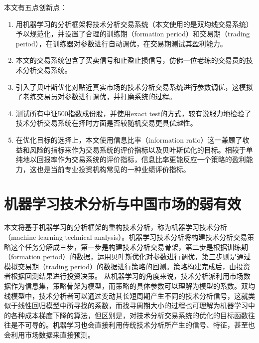 \documentclass[twoside,longtitle]{LZUthesis}
\begin{document}
本文有五点创新点：
\begin{enumerate}
    \item 用机器学习的分析框架将技术分析交易系统（本文使用的是双均线交易系统）予以规范化，并设置了合理的训练期（formation period）和交易期（trading period），在训练器对参数进行自动调优，在交易期测试其盈利能力。
    \item 本文的交易系统包含了买卖信号和止盈止损信号，仿佛一位老练的交易员的技术分析交易系统。
    \item 引入了贝叶斯优化对贴近真实市场的技术分析交易系统进行参数调优，这模拟了老练交易员对参数进行调优，并打磨系统的过程。
    \item 测试所有中证500指数成份股，并使用exact test的方式，较有说服力地检验了技术分析交易系统在择时方面是否较随机交易更具优越性。
    \item 在优化目标的选择上，本文使用信息比率（information ratio）这一兼顾了收益和风险的指标来作为交易系统的评价指标以及贝叶斯优化的目标。相较于单纯地以回报率作为交易系统的评价指标，信息比率更能反应一个策略的盈利能力，这也是当前专业投资机构常见的一种业绩评价指标。
\end{enumerate}




\chapter{机器学习技术分析与中国市场的弱有效}
本文将基于机器学习的分析框架的重构技术分析，称为机器学习技术分析（machine learning technical analysis）。机器学习技术分析将构建技术分析交易策略这个任务分解成三步，第一步是构建技术分析交易骨架，第二步是根据训练期（formation period）的数据，运用贝叶斯优化对参数进行调优，第三步则是通过模拟交易期（trading period）的数据进行策略的回测。策略构建完成后，由投资者根据回测结果进行投资决策。
从机器学习的角度来说，技术分析派利用市场数据作为信息集，策略骨架为模型，而策略的具体参数可以理解为模型的系数。双均线模型中，技术分析者可以通过变动其长短周期产生不同的技术分析信号，这就类似于线性回归模型中所寻找的系数\hat{\beta}，而找寻周期大小的过程也可理解为机器学习中的各种成本梯度下降的算法，但区别是，对技术分析交易系统的优化的目标函数往往是不可导的。机器学习也会直接利用传统技术分析所产生的信号、特征，甚至也会利用市场数据来直接预测。
\end{document}
